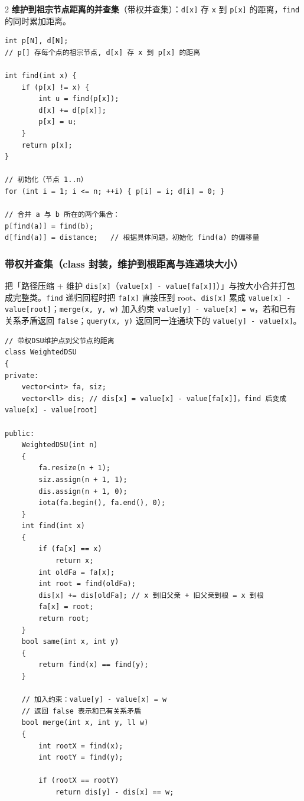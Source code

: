 \begin{multicols*}{2}
		\textbf{维护到祖宗节点距离的并查集}（带权并查集）：\texttt{d[x]} 存 \texttt{x} 到 \texttt{p[x]} 的距离，\texttt{find} 的同时累加距离。

		\begin{verbatim}
int p[N], d[N];
// p[] 存每个点的祖宗节点, d[x] 存 x 到 p[x] 的距离

int find(int x) {
    if (p[x] != x) {
        int u = find(p[x]);
        d[x] += d[p[x]];
        p[x] = u;
    }
    return p[x];
}

// 初始化（节点 1..n）
for (int i = 1; i <= n; ++i) { p[i] = i; d[i] = 0; }

// 合并 a 与 b 所在的两个集合：
p[find(a)] = find(b);
d[find(a)] = distance;   // 根据具体问题，初始化 find(a) 的偏移量
		\end{verbatim}


		\subsubsection{带权并查集（class 封装，维护到根距离与连通块大小）}

		把「路径压缩 + 维护 \texttt{dis[x]}（\texttt{value[x] - value[fa[x]]}）」与按大小合并打包成完整类。\texttt{find} 递归回程时把 \texttt{fa[x]} 直接压到 root、\texttt{dis[x]} 累成 \texttt{value[x] - value[root]}；\texttt{merge(x, y, w)} 加入约束 \texttt{value[y] - value[x] = w}，若和已有关系矛盾返回 \texttt{false}；\texttt{query(x, y)} 返回同一连通块下的 \texttt{value[y] - value[x]}。

		\begin{verbatim}
// 带权DSU维护点到父节点的距离
class WeightedDSU
{
private:
    vector<int> fa, siz;
    vector<ll> dis; // dis[x] = value[x] - value[fa[x]]，find 后变成 value[x] - value[root]

public:
    WeightedDSU(int n)
    {
        fa.resize(n + 1);
        siz.assign(n + 1, 1);
        dis.assign(n + 1, 0);
        iota(fa.begin(), fa.end(), 0);
    }
    int find(int x)
    {
        if (fa[x] == x)
            return x;
        int oldFa = fa[x];
        int root = find(oldFa);
        dis[x] += dis[oldFa]; // x 到旧父亲 + 旧父亲到根 = x 到根
        fa[x] = root;
        return root;
    }
    bool same(int x, int y)
    {
        return find(x) == find(y);
    }

    // 加入约束：value[y] - value[x] = w
    // 返回 false 表示和已有关系矛盾
    bool merge(int x, int y, ll w)
    {
        int rootX = find(x);
        int rootY = find(y);

        if (rootX == rootY)
            return dis[y] - dis[x] == w;


\end{verbatim}
\end{multicols*}
